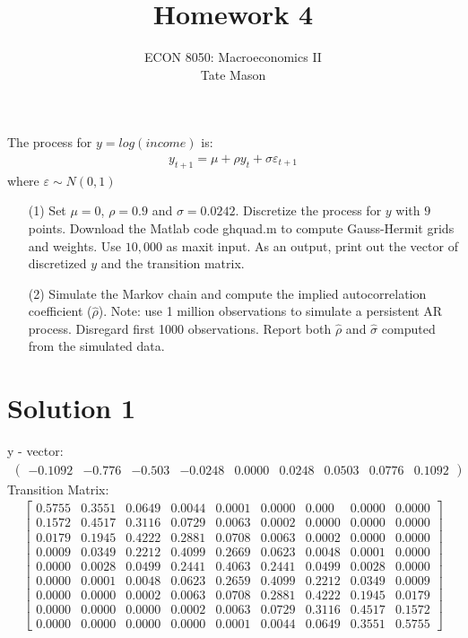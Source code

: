 \documentclass[10pt,a4paper]{article}
\begin{document}
\title{Homework 4}
\author{ECON 8050: Macroeconomics II \\ Tate Mason}
\date{}
\maketitle

The process for $y = log(income)$ is:
\begin{align*}
    y_{t+1} = \mu + \rho y_t + \sigma \varepsilon_{t+1}
\end{align*}
where $\varepsilon \sim N(0, 1)$

\begin{enumerate}
    \item[(1)] Set $\mu = 0$, $\rho = 0.9$ and $\sigma = 0.0242$. Discretize the process for $y$ with $9$ points. Download the Matlab code ghquad.m to compute Gauss-Hermit grids and weights. Use $10,000$ as maxit input. As an output, print out the vector of discretized $y$ and the transition matrix.
    
    \item[(2)] Simulate the Markov chain and compute the implied autocorrelation coefficient ($\hat{\rho}$). Note: use 1 million observations to simulate a persistent AR process. Disregard first 1000 observations. Report both $\hat{\rho}$ and $\hat{\sigma}$ computed from the simulated data.
\end{enumerate}

\section*{Solution 1}
  y - vector:
    \begin{gather*}
      \begin{pmatrix} -0.1092 & -0.776 & -0.503 & -0.0248 & 0.0000 & 0.0248 & 0.0503 & 0.0776 & 0.1092 \end{pmatrix}
    \end{gather*}
  Transition Matrix:
    \begin{gather*}
      \begin{bmatrix}
        0.5755 & 0.3551 & 0.0649 & 0.0044 & 0.0001 & 0.0000 & 0.000 & 0.0000 & 0.0000 \\
        0.1572 & 0.4517 & 0.3116 & 0.0729 & 0.0063 & 0.0002 & 0.0000 & 0.0000 & 0.0000 \\
        0.0179 & 0.1945 & 0.4222 & 0.2881 & 0.0708 & 0.0063 & 0.0002 & 0.0000 & 0.0000 \\
        0.0009 & 0.0349 & 0.2212 & 0.4099 & 0.2669 & 0.0623 & 0.0048 & 0.0001 & 0.0000 \\
        0.0000 & 0.0028 & 0.0499 & 0.2441 & 0.4063 & 0.2441 & 0.0499 & 0.0028 & 0.0000 \\
        0.0000 & 0.0001 & 0.0048 & 0.0623 & 0.2659 & 0.4099 & 0.2212 & 0.0349 & 0.0009 \\
        0.0000 & 0.0000 & 0.0002 & 0.0063 & 0.0708 & 0.2881 & 0.4222 & 0.1945 & 0.0179 \\
        0.0000 & 0.0000 & 0.0000 & 0.0002 & 0.0063 & 0.0729 & 0.3116 & 0.4517 & 0.1572 \\
        0.0000 & 0.0000 & 0.0000 & 0.0000 & 0.0001 & 0.0044 & 0.0649 & 0.3551 & 0.5755
      \end{bmatrix}
    \end{gather*}
\end{document}
